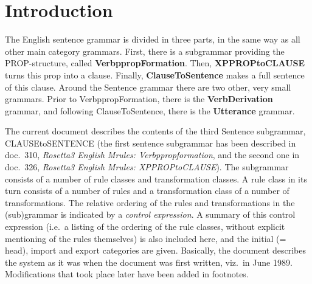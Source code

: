 

   \RosSupersedes{-}
   \MakeRosTitle
%
%

\section{Introduction}
The English sentence grammar is divided in three parts, in the same way as all
other main category grammars. First, there is a subgrammar providing the 
PROP-structure, 
called {\bf VerbppropFormation}. Then, {\bf XPPROPtoCLAUSE} turns this prop
into a clause. Finally, {\bf ClauseToSentence} makes a full sentence of this
clause. Around the Sentence grammar there are two other, very small grammars.
Prior to VerbppropFormation, there is the {\bf VerbDerivation} grammar, and
following ClauseToSentence, there is the {\bf Utterance} grammar.

The current document describes the contents of 
the third Sentence subgrammar, CLAUSEtoSENTENCE (the first sentence subgrammar 
has been described in doc.\ 310, {\em Rosetta3 English Mrules: 
Verbppropformation\/}, and the second one in doc.\ 326, {\em Rosetta3 English 
Mrules: XPPROPtoCLAUSE\/}). The subgrammar consists of 
a number of rule classes and transformation classes. A rule class in its turn
consists of a number of rules and a transformation class of a number of 
transformations. The relative ordering of the rules and transformations in the
(sub)grammar is indicated by a {\em control expression}. A summary of this
control expression (i.e.\ a listing of the ordering of the rule classes, 
without explicit mentioning of the rules themselves) is also included here, 
and the initial (= head), import and export categories are given. Basically, 
the document describes the system as it was when the document was first 
written, viz.\ in June 1989. Modifications that took place later have been 
added in footnotes.

